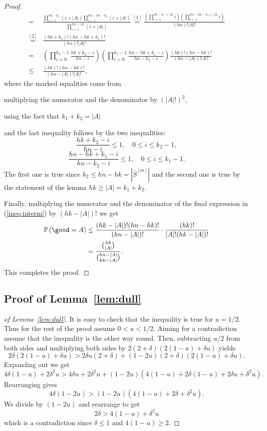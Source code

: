 \documentclass[runningheads, envcountsame, smallextended]{llncs}
\newcommand{\pr}{{\mathbb P}}
\numberwithin{theorem}{section}
\numberwithin{definition}{section}
\numberwithin{lemma}{section}
\numberwithin{corollary}{section}
\numberwithin{proposition}{section}
\numberwithin{conjecture}{section}
\numberwithin{remark}{section}
\numberwithin{equation}{section}
\begin{document}
\begin{proof}
\begin{equation}
\begin{split}
			= & \frac{ \prod_{i = 1}^{hk-k_1} (i+|A|) \prod_{i=1}^{hn-hk-k_2} (i+|A|) }{\prod_{i=1}^{hn-|A|}(i+|A|)} \overset{[1]}=
			\frac{ \left( \prod_{i = 1}^{hk-k_1+|A|} i\right) \left(\prod_{i=1}^{hn-hk-k_2+|A|} i \right)}{(hn)!|A|!} \\
			\overset{[2]}= & \frac{(hk+k_2)!(hn-hk+k_1)!}{(hn)!|A|!} \\
			= & \left(\prod_{i=0}^{k_2-1}\frac{hk+k_2-i}{hn-i}\right) \left(\prod_{i=0}^{k_1-1}\frac{hn-hk+k_1-i}{hn-k_2-i}\right) \frac{(hk)!(hn-hk)!}{(hn-|A|)!|A|!}\\
			\leq & \frac{(hk)!(hn-hk)!}{(hn-|A|)!|A|!},
		\end{split}
	\end{equation}
	where the marked equalities come from 
	\begin{enumerate}[label={[\arabic*]}]
		\item multiplying the numerator and the denominator by $(|A|!)^2$,
		\item using the fact that $k_1+k_2 = |A|$
	\end{enumerate}
	and the last inequality follows by the two inequalities:
	\[
	\frac{hk+k_2-i}{hn-i} \leq 1, \quad 0 \leq i \leq k_2-1,
	\]
	\[
	\frac{hn-hk+k_1-i}{hn-k_2-i} \leq 1, \quad 0 \leq i \leq k_1-1.
	\]
	The first one is true since $k_2 \leq hn-hk = |\bar{S}^{[m]}|$ and the second one is true by the statement of the lemma $hk \geq |A| = k_1 + k_2$.
	
	Finally, multiplying the numerator and the denominator of the final expression in (\ref{ineq:interm}) by $(hk-|A|)!$ we get
	\[
	\begin{split}
		\pr\left( \good =  A \right) & \leq \frac{(hk-|A|)!(hn-hk)!}{(hn-|A|)!} \cdot \frac{(hk)!}{|A|!(hk-|A|)! } \\
		& = \frac{\binom{hk}{|A|}}{\binom{hn-|A|}{hk -|A|}}.
	\end{split}
	\]
	This completes the proof.
\end{proof}


\subsection{Proof of Lemma~\ref{lem:dull}} \label{app.two_lemmas}
%
\begin{proof}[of Lemma~\ref{lem:dull}]
	It is easy to check that the inequality is true for $u=1/2$. Thus for the rest of the proof assume $0<u<1/2$. Aiming for a contradiction assume that the inequality is the other way round. Then, subtracting $u/2$ from both sides and multiplying both sides by $2(2+\delta)(2(1-u)+\delta u)$ yields 
	\[
	2\delta(2(1-u) + \delta u) > 2\delta u (2+\delta) + (1-2u)(2+\delta)(2(1-u)+\delta u).
	\]
	Expanding out we get
	\[
	4\delta (1-u) + 2\delta^2 u > 4\delta u+2\delta^2 u + (1-2u)( 4(1-u)+2\delta(1-u)+ 2\delta u+\delta^2u  ).
	\]
	Rearranging gives
	\[
	4\delta (1-2u)  >  (1-2u)( 4(1-u)+2\delta + \delta^2u  ).
	\]
	We divide by $(1-2u)$ and rearrange to get
	\[
	2\delta  >   4(1-u) + \delta^2u   
	\]
	which is a contradiction since $\delta \leq 1$ and $4(1-u)\geq 2$.    
\end{proof}
\end{document}
